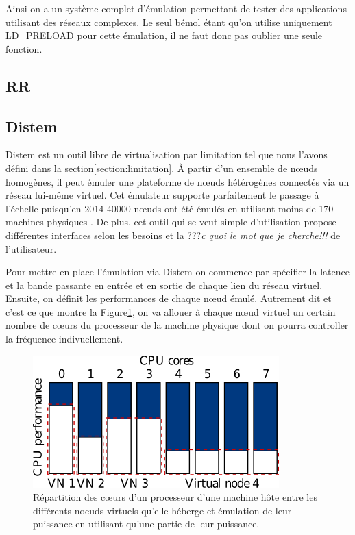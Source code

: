 Ainsi on a un système complet d'émulation permettant de tester des applications utilisant des réseaux complexes. Le seul bémol étant qu'on utilise uniquement LD\_PRELOAD pour cette émulation, il ne faut donc pas oublier une seule fonction.

\subsection{RR}

\subsection{Distem}

Distem \citep{DISTEM} est un outil libre de virtualisation par limitation tel que nous l'avons défini dans la section\ref{section:limitation}. À partir d'un ensemble de n\oe uds homogènes, il peut émuler une plateforme de n\oe uds hétérogènes connectés via un réseau lui-même virtuel. Cet émulateur supporte parfaitement le passage à l'échelle puisqu'en 2014 40000 n\oe uds ont été émulés en utilisant moins de 170 machines physiques \citep{DISTEM_buchert2014emulation}. De plus, cet outil qui se veut simple d'utilisation propose différentes interfaces selon les besoins et la ???\textit{c quoi le mot que je cherche!!!} de l'utilisateur.

Pour mettre en place l'émulation via Distem on commence par spécifier la latence et la bande passante en entrée et en sortie de chaque lien du réseau virtuel. Ensuite, on définit les performances de chaque n\oe ud émulé. Autrement dit et c'est ce que montre la Figure\ref{Distem_core}, on va allouer à chaque n\oe ud virtuel un certain nombre de c\oe urs du processeur de la machine physique dont on pourra controller la fréquence indivuellement.

  \begin{figure}[H]
  \centering
  \includegraphics[scale=0.70]{Pictures/png/Distem_repartion_coeurs_v1}
  \caption{Répartition des c\oe urs d'un processeur d'une machine hôte entre les différents noeuds virtuels qu'elle héberge et émulation de leur puissance en utilisant qu'une partie de leur puissance.}
  \label{Distem_core}
  \end{figure}
  
